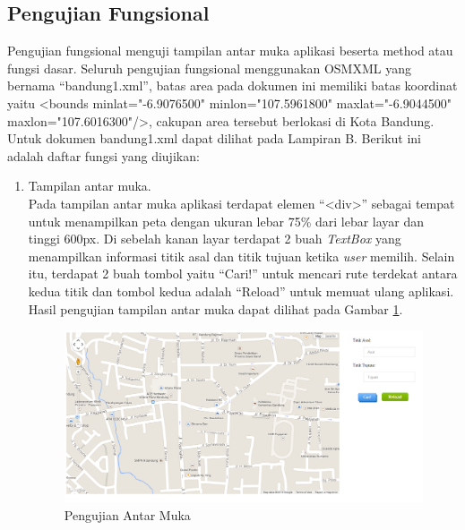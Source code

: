 \subsection{Pengujian Fungsional}
Pengujian fungsional menguji tampilan antar muka aplikasi beserta method atau
fungsi dasar. Seluruh pengujian fungsional menggunakan OSMXML
yang bernama ``bandung1.xml'', batas area pada dokumen ini memiliki batas
koordinat yaitu <bounds minlat="-6.9076500" minlon="107.5961800" maxlat="-6.9044500" 
maxlon="107.6016300"/>, cakupan area tersebut berlokasi di Kota Bandung. Untuk
dokumen bandung1.xml dapat dilihat pada Lampiran B. Berikut ini adalah daftar
fungsi yang diujikan:
\begin{enumerate}
  \item Tampilan antar muka.\\
  Pada tampilan antar muka aplikasi terdapat elemen ``<div>'' sebagai tempat
  untuk menampilkan peta dengan ukuran lebar 75\% dari lebar layar dan tinggi 600px. 
  Di sebelah kanan layar terdapat 2 buah \textit{TextBox} yang menampilkan informasi titik asal
  dan titik tujuan ketika \textit{user} memilih. Selain itu, terdapat 2 buah
  tombol yaitu ``Cari!'' untuk mencari rute terdekat antara kedua titik
  dan tombol kedua adalah ``Reload'' untuk memuat ulang aplikasi. Hasil
  pengujian tampilan antar muka dapat dilihat pada Gambar \ref{fig:pu_antarmuka}.
\begin{figure}[h]
\centering
\includegraphics[scale=0.45]{Gambar/pu_antarmuka}
\caption[Pengujian Antar Muka]{Pengujian Antar Muka}
\label{fig:pu_antarmuka}
\end{figure}
  

\end{enumerate}
